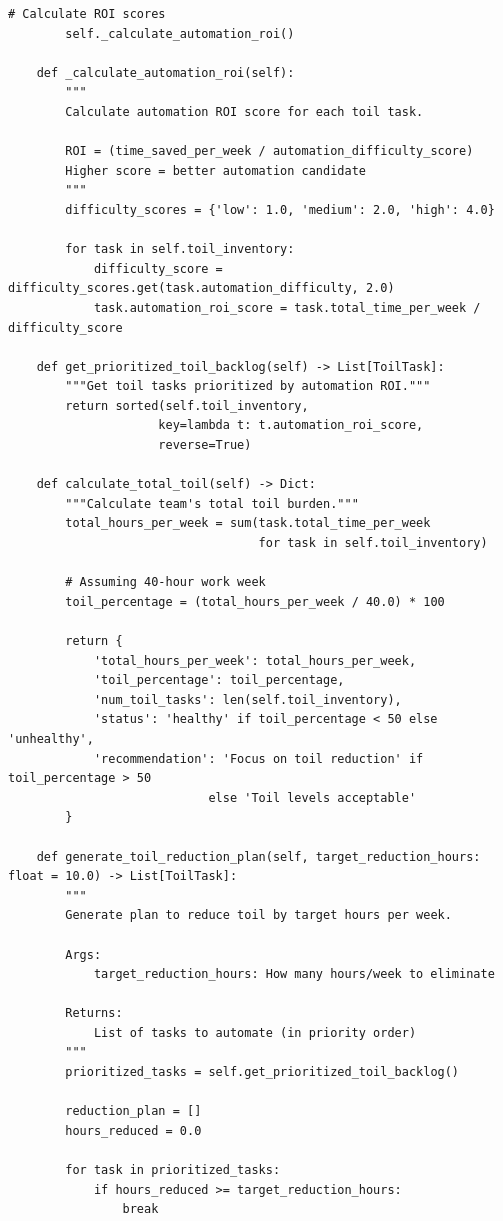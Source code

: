 \begin{lstlisting}[style=python, caption={Toil identification and reduction framework}]
        # Calculate ROI scores
        self._calculate_automation_roi()

    def _calculate_automation_roi(self):
        """
        Calculate automation ROI score for each toil task.

        ROI = (time_saved_per_week / automation_difficulty_score)
        Higher score = better automation candidate
        """
        difficulty_scores = {'low': 1.0, 'medium': 2.0, 'high': 4.0}

        for task in self.toil_inventory:
            difficulty_score = difficulty_scores.get(task.automation_difficulty, 2.0)
            task.automation_roi_score = task.total_time_per_week / difficulty_score

    def get_prioritized_toil_backlog(self) -> List[ToilTask]:
        """Get toil tasks prioritized by automation ROI."""
        return sorted(self.toil_inventory,
                     key=lambda t: t.automation_roi_score,
                     reverse=True)

    def calculate_total_toil(self) -> Dict:
        """Calculate team's total toil burden."""
        total_hours_per_week = sum(task.total_time_per_week
                                   for task in self.toil_inventory)

        # Assuming 40-hour work week
        toil_percentage = (total_hours_per_week / 40.0) * 100

        return {
            'total_hours_per_week': total_hours_per_week,
            'toil_percentage': toil_percentage,
            'num_toil_tasks': len(self.toil_inventory),
            'status': 'healthy' if toil_percentage < 50 else 'unhealthy',
            'recommendation': 'Focus on toil reduction' if toil_percentage > 50
                            else 'Toil levels acceptable'
        }

    def generate_toil_reduction_plan(self, target_reduction_hours: float = 10.0) -> List[ToilTask]:
        """
        Generate plan to reduce toil by target hours per week.

        Args:
            target_reduction_hours: How many hours/week to eliminate

        Returns:
            List of tasks to automate (in priority order)
        """
        prioritized_tasks = self.get_prioritized_toil_backlog()

        reduction_plan = []
        hours_reduced = 0.0

        for task in prioritized_tasks:
            if hours_reduced >= target_reduction_hours:
                break


\end{lstlisting}
